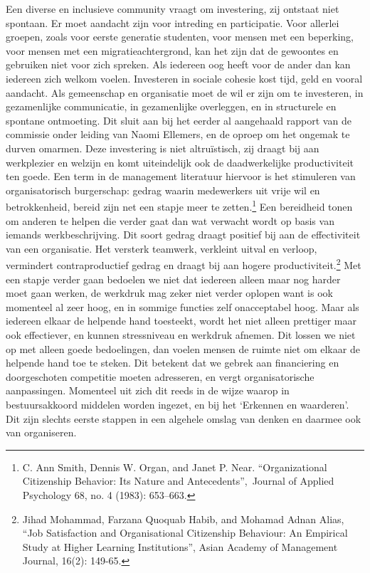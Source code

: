 \documentclass{jote-book}
\begin{document}
	Een diverse en inclusieve community vraagt om investering, zij ontstaat niet spontaan. Er moet aandacht zijn voor intreding en participatie. Voor allerlei groepen, zoals voor eerste generatie studenten, voor mensen met een beperking, voor mensen met een migratieachtergrond, kan het zijn dat de gewoontes en gebruiken niet voor zich spreken. Als iedereen oog heeft voor de ander dan kan iedereen zich welkom voelen. Investeren in sociale cohesie kost tijd, geld en vooral aandacht. Als gemeenschap en organisatie moet de wil er zijn om te investeren, in gezamenlijke communicatie, in gezamenlijke overleggen, en in structurele en spontane ontmoeting. Dit sluit aan bij het eerder al aangehaald rapport van de commissie onder leiding van Naomi Ellemers, en de oproep om het ongemak te durven omarmen. Deze investering is niet altruïstisch, zij draagt bij aan werkplezier en welzijn en komt uiteindelijk ook de daadwerkelijke productiviteit ten goede. Een term in de management literatuur hiervoor is het stimuleren van organisatorisch burgerschap: gedrag waarin medewerkers uit vrije wil en betrokkenheid, bereid zijn net een stapje meer te zetten.\footnote{C. Ann Smith, Dennis W. Organ, and Janet P. Near. “Organizational Citizenship Behavior: Its Nature and Antecedents”, Journal of Applied Psychology 68, no. 4 (1983): 653--663.} Een bereidheid tonen om anderen te helpen die verder gaat dan wat verwacht wordt op basis van iemands werkbeschrijving. Dit soort gedrag draagt positief bij aan de effectiviteit van een organisatie. Het versterk teamwerk, verkleint uitval en verloop, vermindert contraproductief gedrag en draagt bij aan hogere productiviteit.\footnote{Jihad Mohammad, Farzana Quoquab Habib, and Mohamad Adnan Alias, “Job Satisfaction and Organisational Citizenship Behaviour: An Empirical Study at Higher Learning Institutions”, Asian Academy of Management Journal, 16(2): 149-65.} Met een stapje verder gaan bedoelen we niet dat iedereen alleen maar nog harder moet gaan werken, de werkdruk mag zeker niet verder oplopen want is ook momenteel al zeer hoog, en in sommige functies zelf onacceptabel hoog. Maar als iedereen elkaar de helpende hand toesteekt, wordt het niet alleen prettiger maar ook effectiever, en kunnen stressniveau en werkdruk afnemen. Dit lossen we niet op met alleen goede bedoelingen, dan voelen mensen de ruimte niet om elkaar de helpende hand toe te steken. Dit betekent dat we gebrek aan financiering en doorgeschoten competitie moeten adresseren, en vergt organisatorische aanpassingen. Momenteel uit zich dit reeds in de wijze waarop in bestuursakkoord middelen worden ingezet, en bij het ‘Erkennen en waarderen'. Dit zijn slechts eerste stappen in een algehele omslag van denken en daarmee ook van organiseren.
\end{document}
